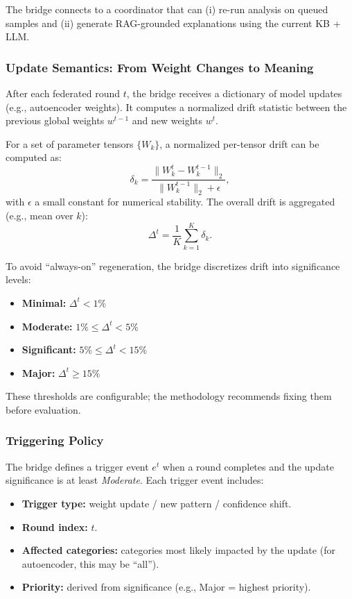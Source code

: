 \documentclass[conference]{IEEEtran}
\begin{document}
The bridge connects to a coordinator that can (i) re-run analysis on queued samples and (ii) generate RAG-grounded explanations using the current KB + LLM.

\subsubsection{Update Semantics: From Weight Changes to Meaning}
\label{sec:update-semantics}

After each federated round $t$, the bridge receives a dictionary of model updates (e.g., autoencoder weights). It computes a normalized drift statistic between the previous global weights $w^{t-1}$ and new weights $w^{t}$.

For a set of parameter tensors $\{W_k\}$, a normalized per-tensor drift can be computed as:
\begin{equation}
\delta_k = \frac{\lVert W_k^{t} - W_k^{t-1} \rVert_2}{\lVert W_k^{t-1} \rVert_2 + \epsilon},
\end{equation}
with $\epsilon$ a small constant for numerical stability. The overall drift is aggregated (e.g., mean over $k$):
\begin{equation}
\Delta^{t} = \frac{1}{K}\sum_{k=1}^{K} \delta_k.
\end{equation}

To avoid ``always-on'' regeneration, the bridge discretizes drift into significance levels:
\begin{itemize}
  \item \textbf{Minimal:} $\Delta^{t} < 1\%$
  \item \textbf{Moderate:} $1\% \le \Delta^{t} < 5\%$
  \item \textbf{Significant:} $5\% \le \Delta^{t} < 15\%$
  \item \textbf{Major:} $\Delta^{t} \ge 15\%$
\end{itemize}
These thresholds are configurable; the methodology recommends fixing them before evaluation.

\subsubsection{Triggering Policy}
\label{sec:trigger-policy}

The bridge defines a trigger event $e^{t}$ when a round completes and the update significance is at least \emph{Moderate}. Each trigger event includes:
\begin{itemize}
  \item \textbf{Trigger type:} weight update / new pattern / confidence shift.
  \item \textbf{Round index:} $t$.
  \item \textbf{Affected categories:} categories most likely impacted by the update (for autoencoder, this may be ``all'').
  \item \textbf{Priority:} derived from significance (e.g., Major = highest priority).
\end{itemize}
\end{document}
